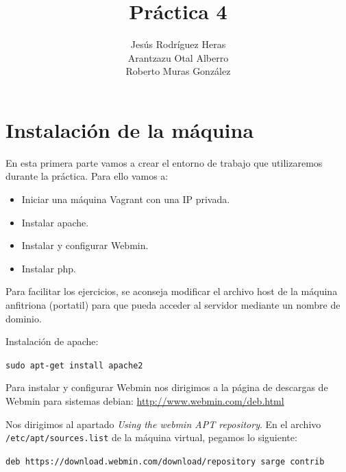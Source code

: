 \documentclass[12pt,letterpaper]{article}
\title{Práctica 4}
\author{Jesús Rodríguez Heras\\
	Arantzazu Otal Alberro\\
Roberto Muras González}
\begin{document}
	
	\maketitle
%			
	\thispagestyle{empty}
	\newpage
	
	
	
	
	
	
\section{Instalación de la máquina}
En esta primera parte vamos a crear el entorno de trabajo que utilizaremos durante la práctica. Para ello vamos a:
\begin{itemize}
	\item Iniciar una máquina Vagrant con una IP privada.
	\item Instalar apache.
	\item Instalar y configurar Webmin.
	\item Instalar php.
\end{itemize}

Para facilitar los ejercicios, se aconseja modificar el archivo host de la máquina anfitriona (portatil) para que pueda acceder al servidor mediante un nombre de dominio.

Instalación de apache:
\begin{center}
	\texttt{sudo apt-get install apache2}
\end{center}

Para instalar y configurar Webmin nos dirigimos a la página de descargas de Webmin para sistemas debian: \url{http://www.webmin.com/deb.html}

Nos dirigimos al apartado \textit{Using the webmin APT repository}. En el archivo \texttt{/etc/apt/sources.list} de la máquina virtual, pegamos lo siguiente:
\begin{center}
	\texttt{deb https://download.webmin.com/download/repository sarge contrib}
\end{center}
\end{document}
